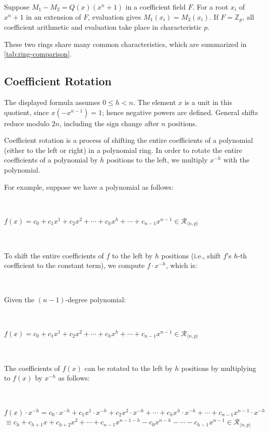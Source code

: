 \begin{tcolorbox}[title={\textbf{\tboxlabel{\ref*{subsubsec:polynomial-ring-discuss}} Polynomial Evaluation over Polynomial Ring}}]

Suppose $M_1-M_2=Q(x)(x^n+1)$ in a coefficient field $F$. For a root $x_i$ of $x^n+1$ in an extension of $F$, evaluation gives $M_1(x_i)=M_2(x_i)$. If $F=\mathbb{Z}_p$, all coefficient arithmetic and evaluation take place in characteristic $p$.

\end{tcolorbox}

 These two rings share many common characteristics, which are summarized in \autoref{tab:ring-comparison}. 


\subsection{Coefficient Rotation}
\label{subsec:coeff-rotation}

The displayed formula assumes $0\le h<n$. The element $x$ is a unit in this quotient, since $x(-x^{n-1})=1$; hence negative powers are defined. General shifts reduce modulo $2n$, including the sign change after $n$ positions.

Coefficient rotation is a process of shifting the entire coefficients of a polynomial (either to the left or right) in a polynomial ring. In order to rotate the entire coefficients of a polynomial by $h$ positions to the left, we multiply $x^{-h}$ with the polynomial. 

For example, suppose we have a polynomial as follows:

$ $

$f(x) = c_0 + c_1x^1 + c_2x^2 + \cdots + c_hx^h + \cdots + c_{n-1}x^{n-1} \in \mathcal{R}_{\langle n, p \rangle}$

$ $

To shift the entire coefficients of $f$ to the left by $h$ positions (i.e., shift $f$'s $h$-th coefficient to the constant term), we compute $f \cdot x^{-h}$, which is:

$ $

\begin{tcolorbox}[title={\textbf{\tboxlabel{\ref*{subsec:coeff-rotation}} Polynomial Rotation}}]

Given the $(n-1)$-degree polynomial: 

$ $

$f(x) = c_0 + c_1x^1 + c_2x^2 + \cdots + c_hx^h + \cdots + c_{n-1}x^{n-1} \in \mathcal{R}_{\langle n, p \rangle}$

$ $

The coefficients of $f(x)$ can be rotated to the left by $h$ positions by multiplying to $f(x)$ by $x^{-h}$ as follows:

$ $

$f(x) \cdot x^{-h} = c_0\cdot x^{-h} + c_1x^1 \cdot x^{-h} + c_2x^2 \cdot x^{-h} + \cdots + c_hx^h \cdot x^{-h} + \cdots + c_{n-1}x^{n-1} \cdot x^{-h}$
$\equiv c_h + c_{h+1}x + c_{h+2}x^2 + \cdots + c_{n-1}x^{n-1-h} - c_0x^{n - h} - \cdots - c_{h-1}x^{n-1} \in \mathcal{R}_{\langle n, p \rangle}$
\end{tcolorbox}

